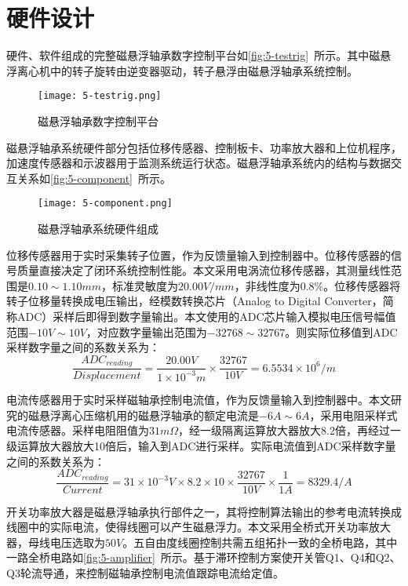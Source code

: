 \documentclass[
  lang=cn,
  degree=master,
  openany,oneside
]{nuaathesis}
\begin{document}
\section{硬件设计}

硬件、软件组成的完整磁悬浮轴承数字控制平台如\autoref{fig:5-testrig}~所示。其中磁悬浮离心机中的转子旋转由逆变器驱动，转子悬浮由磁悬浮轴承系统控制。
\begin{figure}[h!]
	\texttt{[image: 5-testrig.png]}
	\caption{磁悬浮轴承数字控制平台}
	\label{fig:5-testrig}
\end{figure}

磁悬浮轴承系统硬件部分包括位移传感器、控制板卡、功率放大器和上位机程序，加速度传感器和示波器用于监测系统运行状态。磁悬浮轴承系统内的结构与数据交互关系如\autoref{fig:5-component}~所示。

\begin{figure}[h!]
	\texttt{[image: 5-component.png]}
	\caption{磁悬浮轴承系统硬件组成}
	\label{fig:5-component}
\end{figure}

位移传感器用于实时采集转子位置，作为反馈量输入到控制器中。位移传感器的信号质量直接决定了闭环系统控制性能。本文采用电涡流位移传感器，其测量线性范围是$0.10 \sim 1.10mm$，标准灵敏度为$20.00V/mm$，非线性度为$0.8\%$。位移传感器将转子位移量转换成电压输出，经模数转换芯片（Analog to Digital Converter，简称ADC）采样后即得到数字量输出。本文使用的ADC芯片输入模拟电压信号幅值范围$-10V \sim 10V$，对应数字量输出范围为$-32768 \sim 32767$。则实际位移值到ADC采样数字量之间的系数关系为：
\begin{equation}
\frac{ADC_{reading}}{Displacement} = \frac{20.00V}{1 \times 10^{-3}m} \times \frac{32767}{10V} = 6.5534 \times 10^6/m
\end{equation}

电流传感器用于实时采样磁轴承控制电流值，作为反馈量输入到控制器中。本文研究的磁悬浮离心压缩机用的磁悬浮轴承的额定电流是$-6A\sim 6A$，采用电阻采样式电流传感器。采样电阻阻值为$31m\Omega$，经一级隔离运算放大器放大8.2倍，再经过一级运算放大器放大10倍后，输入到ADC进行采样。实际电流值到ADC采样数字量之间的系数关系为：
\begin{equation}
\frac{ADC_{reading}}{Current} = 31 \times 10^{-3}V \times 8.2 \times 10 \times \frac{32767}{10V} \times \frac{1}{1A} = 8329.4/A
\end{equation}

开关功率放大器是磁悬浮轴承执行部件之一，其将控制算法输出的参考电流转换成线圈中的实际电流，使得线圈可以产生磁悬浮力。本文采用全桥式开关功率放大器，母线电压选取为$50V$。五自由度线圈控制共需五组拓扑一致的全桥电路，其中一路全桥电路如\autoref{fig:5-amplifier}~所示。基于滞环控制方案使开关管Q1、Q4和Q2、Q3轮流导通，来控制磁轴承控制电流值跟踪电流给定值。
\end{document}
